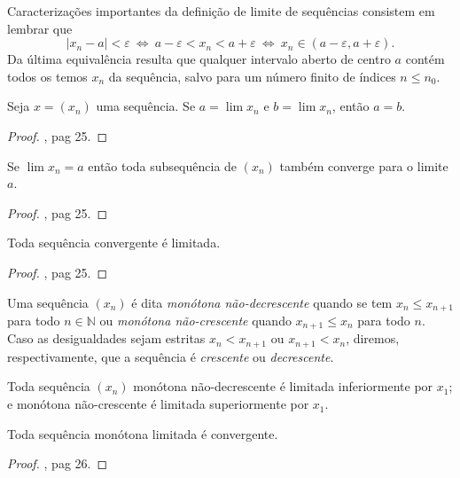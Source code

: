 Caracterizações importantes da definição de limite de sequências consistem em lembrar que $$|x_n -a|<\varepsilon \ \iff\ a-\varepsilon < x_n < a+\varepsilon\ \iff \ x_n \in (a-\varepsilon,a+\varepsilon).$$ Da última equivalência resulta que qualquer intervalo aberto de centro $a$ contém todos os temos $x_n$ da sequência, salvo para um número finito de índices $n\leq n_0$.

\begin{proposicao}
	Seja $x = (x_n)$ uma sequência. Se $a = \lim x_n$ e $b = \lim x_n$, então $a = b$.
	\begin{proof}
		\cite{elonAnalise1}, pag 25.
	\end{proof}
\end{proposicao}

\begin{proposicao}
	Se $\lim x_n = a$ então toda subsequência de $(x_n)$ também converge para o limite $a$.
	\begin{proof}
		\cite{elonAnalise1}, pag 25.
	\end{proof}
\end{proposicao}

\begin{proposicao}
	Toda sequência convergente é limitada.
	\begin{proof}
		\cite{elonAnalise1}, pag 25.
	\end{proof}
\end{proposicao}

\begin{definicao}
	Uma sequência $(x_n)$ é dita \textit{monótona não-decrescente} quando se tem $x_n\leq x_{n+1}$ para todo $n\in \mathbb{N}$ ou \textit{monótona não-crescente} quando $x_{n+1}\leq x_n$ para todo $n$. Caso as desigualdades sejam estritas $x_n < x_{n+1}$ ou $x_{n+1} < x_n$, diremos, respectivamente, que a sequência é \textit{crescente} ou \textit{decrescente}.  
\end{definicao}

\begin{proposicao}
	Toda sequência $(x_n)$ monótona não-decrescente é limitada inferiormente por $x_1$; e monótona não-crescente é limitada superiormente por $x_1$.
\end{proposicao}

\begin{teorema}
	Toda sequência monótona limitada é convergente.
	\begin{proof}
		\cite{elonAnalise1}, pag 26.
	\end{proof}
\end{teorema}

